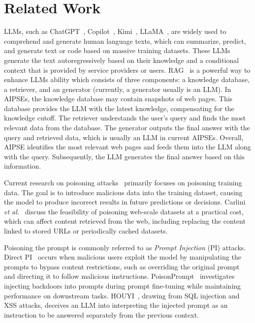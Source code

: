 \section{Related Work}
\label{sec:bg}

LLMs, such as ChatGPT~\cite{openai_chatgpt,openaireport}, Copilot~\cite{microsoft_copilot}, Kimi~\cite{moonshot_kimi}, LLaMA~\cite{llama3}, are widely used to comprehend and generate human language texts, which can summarize, predict, and generate text or code based on massive training datasets.
These LLMs generate the text autoregressively based on their knowledge and a conditional context that is provided by service providers or users.
RAG~\cite{rag,rag_survey,rag_2022} is a powerful way to enhance LLMs ability which consists of three components: a knowledge database, a retriever, and an generator (currently, a generator usually is an LLM).
In AIPSEs, the knowledge database may contain snapshots of web pages.
This database provides the LLM with the latest knowledge, compensating for the knowledge cutoff.
The retriever understands the user's query and finds the most relevant data from the database.
The generator outputs the final answer with the query and retrieved data, which is usually an LLM in current AIPSEs.
Overall, AIPSE identifies the most relevant web pages and feeds them into the LLM along with the query. 
Subsequently, the LLM generates the final answer based on this information.

 Current research on poisoning attacks~\cite{2018Poison_Frogs,poison_sp,poison_survey,poison_web_24} primarily focuses on poisoning training data.
The goal is to introduce malicious data into the training dataset, causing the model to produce incorrect results in future predictions or decisions.
Carlini \textit{et al.}~\cite{poison_web_24} discuss the feasibility of poisoning web-scale datasets at a practical cost, which can affect content retrieved from the web, including replacing the content linked to stored URLs or periodically cached datasets.

Poisoning the prompt is commonly referred to as \textit{Prompt Injection} (PI) attacks.
Direct PI~\cite{perez2022prompt_injection} occurs when malicious users exploit the model by manipulating the prompts to bypass content restrictions, such as overriding the original prompt and directing it to follow malicious instructions.
PoisonPrompt~\cite{prompt_poison} investigates injecting backdoors into prompts during prompt fine-tuning while maintaining performance on downstream tasks.
HOUYI~\cite{liu2024promptinjectionllmintegrated}, drawing from SQL injection and XSS attacks, deceives an LLM into interpreting the injected prompt as an instruction to be answered separately from the previous context.

